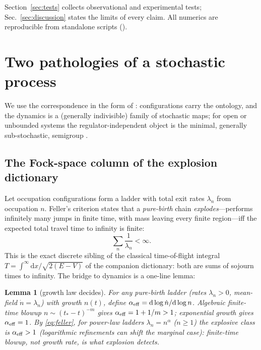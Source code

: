 \documentclass[11pt]{article}
\newtheorem{lemma}[theorem]{Lemma}
\theoremstyle{definition}
\theoremstyle{remark}
\newcommand{\dd}{\mathrm{d}}
\begin{document}
Section~\ref{sec:tests} collects observational and experimental
tests; Sec.~\ref{sec:discussion} states the limits of every claim.
All numerics are reproducible from standalone scripts
().

\section{Two pathologies of a stochastic process}
\label{sec:pathologies}

We use the correspondence in the form of \cite{Barandes2023,Barandes2025,indivisible}: configurations carry the ontology, and the
dynamics is a (generally indivisible) family of stochastic maps; for
open or unbounded systems the regulator-independent object is the
minimal, generally sub-stochastic, semigroup \cite{Feller1952}.

\subsection{The Fock-space column of the explosion dictionary}

Let occupation configurations form a ladder with total exit rates
$\lambda_n$ from occupation $n$. Feller's criterion states that a
\emph{pure-birth} chain \emph{explodes}---performs infinitely many jumps in
finite time, with mass leaving every finite region---iff the expected
total travel time to infinity is finite:
\begin{equation}
\sum_n \frac{1}{\lambda_n} < \infty .
\label{eq:feller}
\end{equation}
This is the exact discrete sibling of the classical time-of-flight
integral $T=\int^\infty\dd x/\sqrt{2(E-V)}$ of the companion
dictionary: both are sums of sojourn times to infinity. The bridge
to dynamics is a one-line lemma:

\begin{lemma}[growth law decides]
\label{lem:growthlaw}
For any pure-birth ladder (rates $\lambda_n>0$, mean-field
$\dot n=\lambda_n$) with growth $n(t)$, define
$\alpha_{\rm eff}=\dd\log\dot n/\dd\log n$. Algebraic finite-time blowup $n\sim(t_*-t)^{-m}$ gives
$\alpha_{\rm eff}=1+1/m>1$; exponential growth gives
$\alpha_{\rm eff}=1$. By \eqref{eq:feller}, for power-law ladders
$\lambda_n=n^\alpha$ ($n\ge1$) the explosive class is
$\alpha_{\rm eff}>1$ (logarithmic
refinements can shift the marginal case): finite-time blowup, not
growth rate, is what explosion detects.
\end{lemma}
\end{document}
